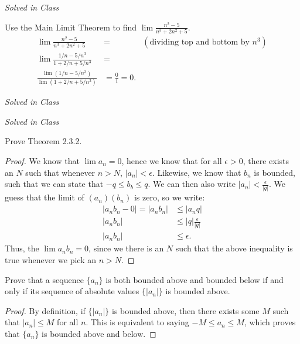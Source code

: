 \documentclass[12pt]{article}
\newenvironment{exercise}[2][Exercise]{\begin{trivlist}
\item[\hskip \labelsep {\bfseries #1}\hskip \labelsep {\bfseries #2.}]}{\end{trivlist}}
\begin{document}
\begin{exercise}{2.3.1}
\emph{Solved in Class}
\end{exercise}


\begin{exercise}{2.3.2}
Use the Main Limit Theorem to find $\lim \frac{n^2 - 5}{n^3 + 2n^2 + 5}$. \\
	\begin{align*}
		\lim \frac{n^2 - 5}{n^3 + 2n^2 + 5} &=  &(\text{dividing top and bottom by $n^3$}) \\
		\lim \frac{1/n - 5/n^3}{1+2/n + 5/n^3} &= \\
		\frac{\lim (1/n - 5/n^3)}{\lim (1+2/n + 5/n^3)} &= \frac{0}{1} = 0.
	\end{align*}
\end{exercise}

\begin{exercise}{2.3.3}
\emph{Solved in Class}
\end{exercise}

\begin{exercise}{2.3.4}
\emph{Solved in Class}
\end{exercise}

\begin{exercise}{2.3.5}
Prove Theorem 2.3.2.

	\begin{proof}
	We know that $\lim a_n = 0$, hence we know that for all $\epsilon > 0$, there exists an $N$ such that whenever $n>N$, $|a_n | < \epsilon$. Likewise, we know that $b_n$ is bounded, such that we can state that $- q \leq b_b \leq q$. We can then also write $|a_n| < \frac{\epsilon}{|q|}$.  We guess that the limit of $ (a_n)(b_n)$ is zero, so we write:
		\begin{align*}
		|a_n b_n - 0| = |a_n b_n| &\leq | a_n q| \\
		|a_n b_n| &\leq |q| \frac{\epsilon}{|q|}  \\
		|a_n b_n| &\leq \epsilon.
		\end{align*}
	Thus, the $\lim a_n b_n = 0$, since we there is an $N$ such that the above inequality is true whenever we pick an $n>N$.
	\end{proof}
\end{exercise}


\begin{exercise}{2.3.6}
Prove that a sequence $\{a_n\}$ is both bounded above and bounded below if and only if its sequence of absolute values $\{|a_n|\}$ is bounded above. 

\begin{proof}
By definition, if $\{|a_n|\}$ is bounded above, then there exists some $M$ such that $|a_n| \leq M$ for all $n$. This is equivalent to saying $-M \leq a_n \leq M$, which proves that $\{a_n\}$ is bounded above and below.
\end{proof}
\end{exercise}
\end{document}
